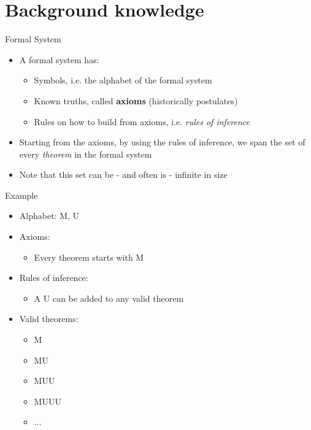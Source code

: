 \documentclass[utf8]{beamer}
\begin{document}
\part{Background knowledge}
\begin{frame}
\partpage
\end{frame}

\begin{frame}{Formal System}
\begin{itemize}
\item A formal system has:
\begin{itemize}
\item Symbols, i.e. the alphabet of the formal system
\item Known truths, called \textbf{axioms} (historically postulates)
\item Rules on how to build from axioms, i.e. \emph{rules of inference}
\end{itemize}
\item Starting from the axioms, by using the rules of inference, we span the set of every \emph{theorem} in the formal
system
\item Note that this set can be - and often is - infinite in size
\end{itemize}
\end{frame}

\begin{frame}{Example}
\begin{itemize}
\item Alphabet: M, U
\item Axioms:
\begin{itemize}
\item Every theorem starts with M
\end{itemize}
\item Rules of inference:
\begin{itemize}
\item A U can be added to any valid theorem
\end{itemize}
\item Valid theorems:
\begin{itemize}
\item M
\item MU
\item MUU
\item MUUU
\item ...
\end{itemize}
\end{itemize}
\end{frame}
\end{document}
